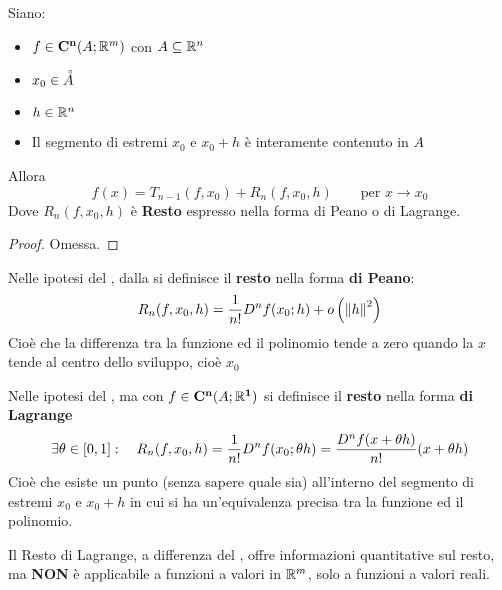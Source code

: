 \begin{theorem}[di Taylor]
	\label{teo:taylor}
	Siano:
	\begin{itemize}[noitemsep]
		\item $f \in \mathbf{C^{n}}(A;\mathbb{R}^m)$ con $A \subseteq \mathbb{R}^n$
		\item $x_0 \in \accentset{\circ}{A}$
		\item $h \in \mathbb{R}^n$
		\item Il segmento di estremi $x_0$ e $x_0 + h$ è interamente contenuto in $A$
	\end{itemize}
	Allora
	\[f(x) = T_{n-1}(f, x_0) + R_n(f, x_0, h) \qquad \text{per } x \to x_0\]
	Dove $R_n(f, x_0, h)$ è \textbf{Resto} espresso nella forma di Peano o di Lagrange.
	\begin{proof}
		Omessa.
	\end{proof}
\end{theorem}

\begin{definition}
	\label{def:resto_peano}
	Nelle ipotesi del , dalla  si definisce il \textbf{resto} nella forma \textbf{di Peano}:
	\[R_n(f, x_0, h) = \frac{1}{n!} D^nf(x_0; h) + o\left( \left\|h\right\|^2 \right)\]
	Cioè che la differenza tra la funzione ed il polinomio tende a zero quando la $x$ tende al centro dello sviluppo, cioè $x_0$
\end{definition}

\begin{definition}
	Nelle ipotesi del , ma con $f \in \mathbf{C^{n}}(A;\mathbb{R}^{\boldsymbol{1}})$ si definisce il \textbf{resto} nella forma \textbf{di Lagrange}
	\[\exists \theta \in \left[0,1\right]: \quad R_n(f, x_0, h) = \frac{1}{n!} D^nf(x_0; \theta h) = \frac{D^n f(x + \theta h)}{n!} (x + \theta h)\]
	Cioè che esiste un punto (senza sapere quale sia) all'interno del segmento di estremi $x_0$ e $x_0 + h$ in cui si ha un'equivalenza precisa tra la funzione ed il polinomio.
\end{definition}
\begin{observation}
	\label{obs:resto_lagr_Rn}
	Il Resto di Lagrange, a differenza del , offre informazioni quantitative sul resto, ma \textbf{NON} è applicabile a funzioni a valori in $\mathbb{R}^m$, solo a funzioni a valori reali.
\end{observation}
\cbend

